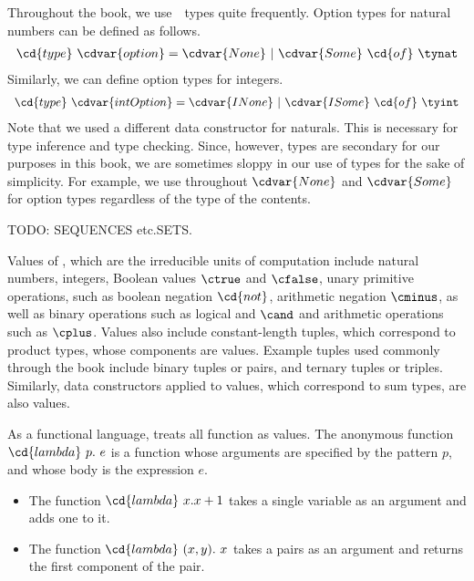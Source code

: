 \begin{gram}
Throughout the book, we use~~types quite frequently.
%
Option types for natural numbers can be defined as follows.
%
\[
\begin{array}{l}
\cd{type}~\cdvar{option} = \cdvar{None} ~|~ \cdvar{Some}~\cd{of}~\tynat
\end{array}
\]
%
Similarly, we can define option types for integers.
%
\[
\begin{array}{l}
\cd{type}~\cdvar{intOption} = \cdvar{INone} ~|~ \cdvar{ISome}~\cd{of}~\tyint
\end{array}
\]
%
Note that we used a different data constructor for naturals.  
%
This is necessary for type inference and type checking.
%
Since, however, types are secondary for our purposes in this book, we
are sometimes sloppy in our use of types for the sake of simplicity.
%
For example, we use throughout $\cdvar{None}$ and $\cdvar{Some}$ for option
types regardless of the type of the contents.
\end{gram}

\begin{teachnote}
TODO: SEQUENCES etc.SETS.
\end{teachnote}


\begin{gram}[Values]
Values of \pml, which are the irreducible units of computation
include natural numbers, integers, Boolean values $\ctrue$ and $\cfalse$,
unary primitive operations, such as boolean negation $\cd{not}$,
arithmetic negation $\cminus$, as well as binary operations such as
logical and $\cand$ and arithmetic operations such as $\cplus$.
%
Values also include constant-length tuples, which correspond to
product types, whose components are values.
%
Example tuples used commonly through the book include binary tuples or
pairs, and ternary tuples or triples.
%
Similarly, data constructors applied to values, which correspond to
sum types, are also values.
%

As a functional language, \pml treats all function as values. 
%
The anonymous function
%
$\cd{lambda}~p.~e$
%
is a function whose arguments are specified by the pattern $p$, and
whose body is the expression $e$.
%
\end{gram}

\begin{example}

\begin{itemize}

\item

The function 
%
$\cd{lambda}~x. x + 1$ takes a single variable as an argument and
adds one to it.
%

\item
The function 
%
$\cd{lambda}~(x,y).~x$ takes a pairs as an argument and
returns the first component of the pair.
\end{itemize}
\end{example}


